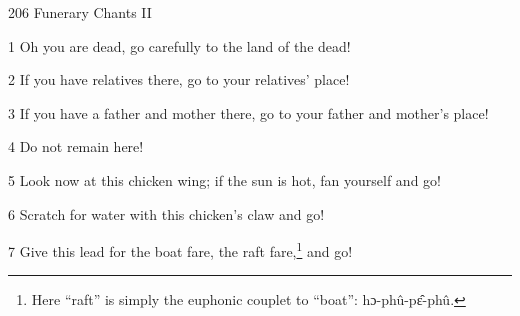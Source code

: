 
206 Funerary Chants II

1 Oh you are dead, go carefully to the land of the dead!

2 If you have relatives there, go to your relatives' place!

3 If you have a father and mother there, go to your father and mother's place!

4 Do not remain here!

5 Look now at this chicken wing; if the sun is hot, fan yourself and go!

6 Scratch for water with this chicken's claw and go!

7 Give this lead for the boat fare, the raft fare,\footnote{Here ``raft'' is simply the euphonic couplet to ``boat'': hɔ-phû-pɛ̂-phû.} and go!

